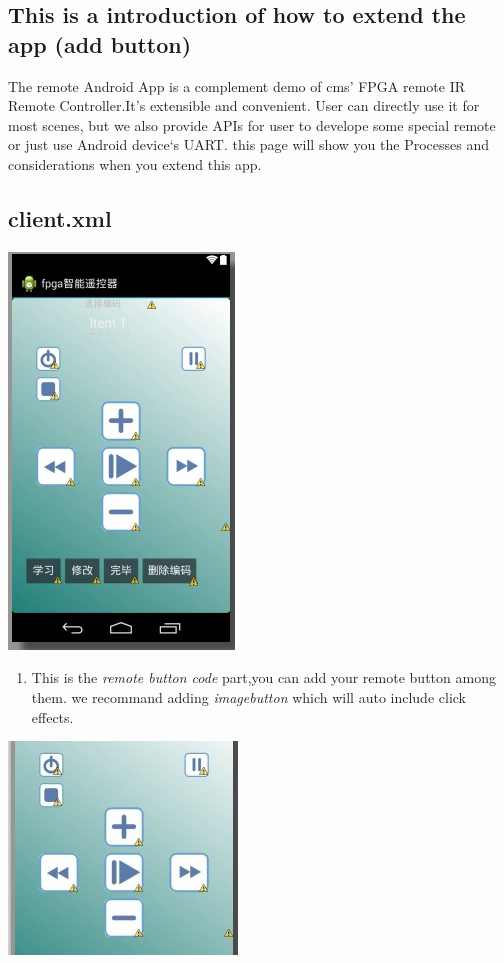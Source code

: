 \documentclass[letterpaper,10pt,english]{sphinxmanual}
\begin{document}
\begin{CJK}{UTF8}{gbsn}
\chapter{This is a introduction of how to  extend the app (add button)}
\label{extension::doc}\label{extension:this-is-a-introduction-of-how-to-extend-the-app-add-button}
The remote Android App  is a complement  demo of cms' FPGA remote IR Remote Controller.It's extensible and convenient. User can directly use it for  most scenes, but we also  provide APIs for user to develope some special remote or just use Android device‘s UART.
this page will show you the Processes and considerations when you extend this app.


\section{client.xml}
\label{extension:client-xml}
\includegraphics{interface.jpg}
\begin{enumerate}
\item {} 
This is the \emph{remote button code} part,you can add your remote button among them. we recommand adding \emph{imagebutton} which will auto include click effects.

\end{enumerate}

\includegraphics{remotebutton.jpg}


\end{CJK}
\end{document}
